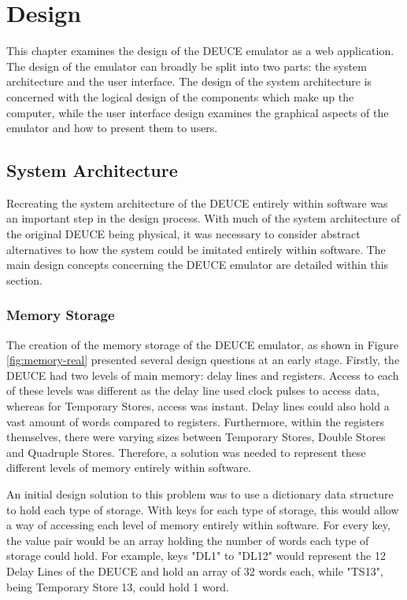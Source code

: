 \documentclass{l4proj}
\begin{document}
\chapter{Design}
This chapter examines the design of the DEUCE emulator as a web application. The design of the emulator can broadly be split into two parts: the system architecture and the user interface. The design of the system architecture is concerned with the logical design of the components which make up the computer, while the user interface design examines the graphical aspects of the emulator and how to present them to users.
\section{System Architecture}
Recreating the system architecture of the DEUCE entirely within software was an important step in the design process. With much of the system architecture of the original DEUCE being physical, it was necessary to consider abstract alternatives to how the system could be imitated entirely within software. The main design concepts concerning the DEUCE emulator are detailed within this section.

\subsection{Memory Storage}
The creation of the memory storage of the DEUCE emulator, as shown in Figure \ref{fig:memory-real} presented several design questions at an early stage. Firstly, the DEUCE had two levels of main memory: delay lines and registers. Access to each of these levels was different as the delay line used clock pulses to access data, whereas for Temporary Stores, access was instant. Delay lines could also hold a vast amount of words compared to registers. Furthermore, within the registers themselves, there were varying sizes between Temporary Stores, Double Stores and Quadruple Stores. Therefore, a solution was needed to represent these different levels of memory entirely within software.

An initial design solution to this problem was to use a dictionary data structure to hold each type of storage. With keys for each type of storage, this would allow a way of accessing each level of memory entirely within software. For every key, the value pair would be an array holding the number of words each type of storage could hold. For example, keys "DL1" to "DL12" would represent the 12 Delay Lines of the DEUCE and hold an array of 32 words each, while "TS13", being Temporary Store 13, could hold 1 word.
\end{document}
